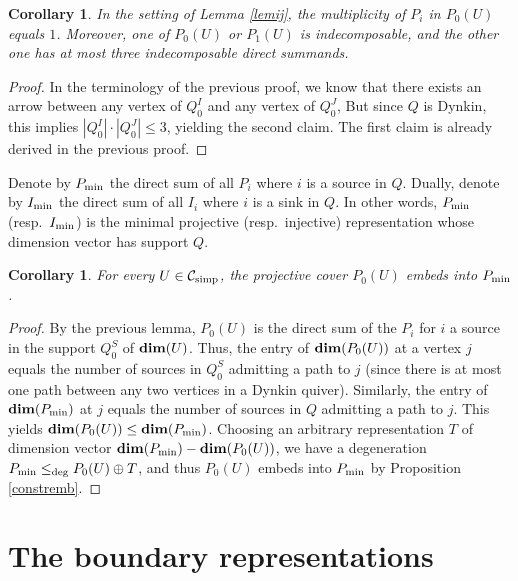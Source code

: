 \documentclass{amsart}
\numberwithin{equation}{section}
\newtheorem{cor}[thm]{Corollary}
\theoremstyle{remark}
\begin{document}
\begin{cor}\label{cornew} In the setting of Lemma \ref{lemij}, the multiplicity of $P_i$ in $P_0(U)$ equals $1$. Moreover, one of $P_0(U)$ or $P_1(U)$ is indecomposable, and the other one has at most three indecomposable direct summands.
\end{cor}

\begin{proof} In the terminology of the previous proof, we know that there exists an arrow between any vertex of $Q_0^I$ and any vertex of $Q_0^J$, But since $Q$ is Dynkin, this implies $|Q_0^I|\cdot|Q_0^J|\leq 3$, yielding the second claim. The first claim is already derived in the previous proof.\end{proof}


Denote by $P_{\rm min}$ the direct sum of all $P_i$ where $i$ is a source in $Q$. Dually, denote by $I_{\rm min}$ the direct sum of all $I_i$ where $i$ is a sink in $Q$. In other words, $P_{\rm min}$ (resp.~$I_{\rm min}$) is the minimal projective (resp.~injective) representation whose dimension vector has support $Q$.

\begin{cor}\label{corp0u} For every $U\in \mathcal{C}_{\rm simp}$, the projective cover $P_0(U)$ embeds into $P_{\rm min}$.
\end{cor}

\begin{proof} By the previous lemma, $P_0(U)$ is the direct sum of the $P_i$ for $i$ a source in the support $Q_0^S$ of ${\rm\bf dim}(U)$. Thus, the entry of ${\rm\bf dim}(P_0(U))$ at a vertex $j$ equals the number of sources in $Q_0^S$ admitting a path to $j$ (since there is at most one path between any two vertices in a Dynkin quiver). 
Similarly, the entry of ${\rm\bf dim}(P_{\rm min})$ at $j$ equals the number of sources in $Q$ admitting a path to $j$. This yields ${\rm\bf dim}(P_0(U))\leq{\rm\bf dim}(P_{\rm min})$. Choosing an arbitrary representation $T$ of dimension vector ${\rm\bf dim}(P_{\rm min})-{\rm\bf dim}(P_0(U))$, we have a degeneration $P_{\rm min}\leq_{\rm deg}P_0(U)\oplus T$, and thus $P_0(U)$ embeds into $P_{\rm min}$ by Proposition \ref{constremb}.\end{proof}

\section{The boundary representations}\label{sec:boundrep}
\end{document}

